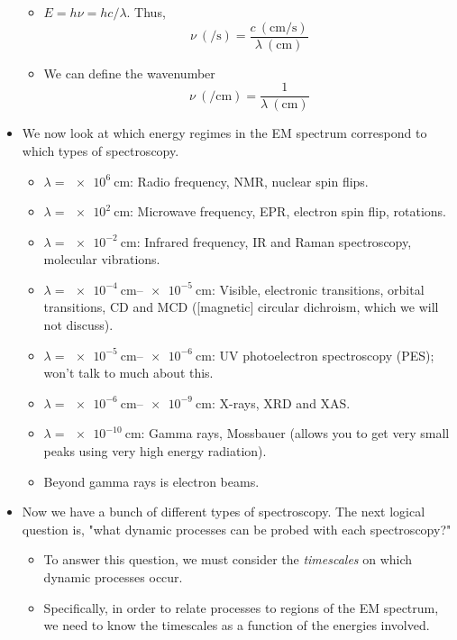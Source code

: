 \documentclass[../notes.tex]{subfiles}
\begin{document}
\begin{itemize}
\begin{itemize}
        \item $E=h\nu=hc/\lambda$. Thus,
        \begin{equation*}
            \nu\ (\si{\per\second}) = \frac{c\ (\si{\centi\meter\per\second})}{\lambda\ (\si{\centi\meter})}
        \end{equation*}
        \item We can define the wavenumber
        \begin{equation*}
            \nu\ (\si{\per\centi\meter}) = \frac{1}{\lambda\ (\si{\centi\meter})}
        \end{equation*}
    \end{itemize}
    \item We now look at which energy regimes in the EM spectrum correspond to which types of spectroscopy.
    \begin{itemize}
        \item $\lambda=\SI{e6}{\centi\meter}$: Radio frequency, NMR, nuclear spin flips.
        \item $\lambda=\SI{e2}{\centi\meter}$: Microwave frequency, EPR, electron spin flip, rotations.
        \item $\lambda=\SI{e-2}{\centi\meter}$: Infrared frequency, IR and Raman spectroscopy, molecular vibrations.
        \item $\lambda=\SIrange{e-4}{e-5}{\centi\meter}$: Visible, electronic transitions, orbital transitions, CD and MCD ([magnetic] circular dichroism, which we will not discuss).
        \item $\lambda=\SIrange{e-5}{e-6}{\centi\meter}$: UV photoelectron spectroscopy (PES); won't talk to much about this.
        \item $\lambda=\SIrange{e-6}{e-9}{\centi\meter}$: X-rays, XRD and XAS.
        \item $\lambda=\SI{e-10}{\centi\meter}$: Gamma rays, Mossbauer (allows you to get very small peaks using very high energy radiation).
        \item Beyond gamma rays is electron beams.
    \end{itemize}
    \item Now we have a bunch of different types of spectroscopy. The next logical question is, "what dynamic processes can be probed with each spectroscopy?"
    \begin{itemize}
        \item To answer this question, we must consider the \emph{timescales} on which dynamic processes occur.
        \item Specifically, in order to relate processes to regions of the EM spectrum, we need to know the timescales as a function of the energies involved.

\end{itemize}
\end{itemize}
\end{document}
